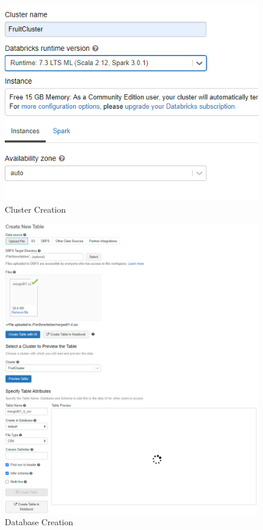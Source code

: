 \documentclass[conference]{IEEEtran}
\begin{document}
\begin{figure}[h]
  \centering
  \includegraphics[width=\linewidth]{cluster_creation.png}
  \caption{Cluster Creation}
\end{figure}

\begin{figure}[h]
  \centering
  \includegraphics[width=\linewidth]{datatable_creation.png}
  \caption{Database Creation}
\end{figure}
\end{document}

